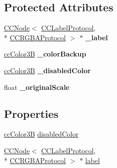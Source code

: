 \subsection*{Protected Attributes}
\begin{DoxyCompactItemize}
\item 
\hypertarget{interface_c_c_menu_item_label_a28a2994c5252195e248986b237e548cb}{\hyperlink{class_c_c_node}{C\-C\-Node}$<$ \hyperlink{protocol_c_c_label_protocol-p}{C\-C\-Label\-Protocol}, \\*
\hyperlink{protocol_c_c_r_g_b_a_protocol-p}{C\-C\-R\-G\-B\-A\-Protocol} $>$ $\ast$ {\bfseries \-\_\-label}}\label{interface_c_c_menu_item_label_a28a2994c5252195e248986b237e548cb}

\item 
\hypertarget{interface_c_c_menu_item_label_a50c0efd7a86c8b7ac150811c0707fdd1}{\hyperlink{cc_types_8h_a829b00c53e72f0115e3880cb508fec1e}{cc\-Color3\-B} {\bfseries \-\_\-color\-Backup}}\label{interface_c_c_menu_item_label_a50c0efd7a86c8b7ac150811c0707fdd1}

\item 
\hypertarget{interface_c_c_menu_item_label_aa57cc21b0c824fa991945006f52b84d5}{\hyperlink{cc_types_8h_a829b00c53e72f0115e3880cb508fec1e}{cc\-Color3\-B} {\bfseries \-\_\-disabled\-Color}}\label{interface_c_c_menu_item_label_aa57cc21b0c824fa991945006f52b84d5}

\item 
\hypertarget{interface_c_c_menu_item_label_a0b4cfdfc30dc56374553805db63340b2}{float {\bfseries \-\_\-original\-Scale}}\label{interface_c_c_menu_item_label_a0b4cfdfc30dc56374553805db63340b2}

\end{DoxyCompactItemize}
\subsection*{Properties}
\begin{DoxyCompactItemize}
\item 
\hyperlink{cc_types_8h_a829b00c53e72f0115e3880cb508fec1e}{cc\-Color3\-B} \hyperlink{interface_c_c_menu_item_label_a0af349543d90f4c4b64435adacb590a1}{disabled\-Color}
\item 
\hyperlink{class_c_c_node}{C\-C\-Node}$<$ \hyperlink{protocol_c_c_label_protocol-p}{C\-C\-Label\-Protocol}, \\*
\hyperlink{protocol_c_c_r_g_b_a_protocol-p}{C\-C\-R\-G\-B\-A\-Protocol} $>$ $\ast$ \hyperlink{interface_c_c_menu_item_label_a43df0655d34a4852f9f74efb8d68d0ef}{label}
\end{DoxyCompactItemize}


